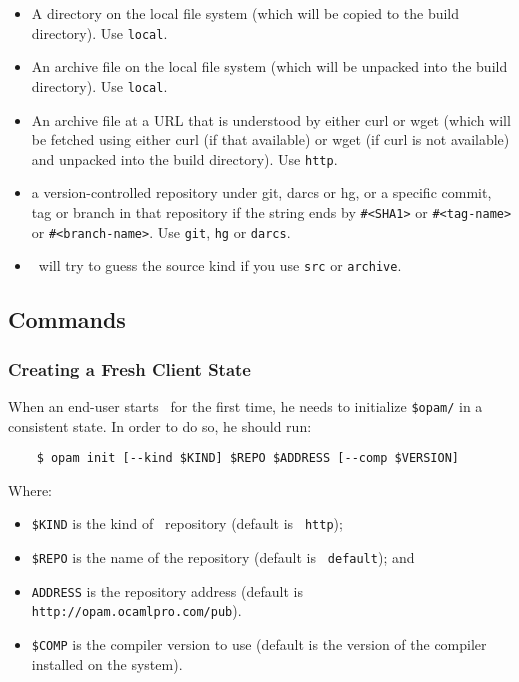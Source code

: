 \documentclass[a4paper,10pt]{article}
\begin{document}
\begin{itemize}
\item A directory on the local file system (which will be copied to
  the build directory). Use {\tt local}.
\item An archive file on the local file system (which will be unpacked
  into the build directory). Use {\tt local}.
\item An archive file at a URL that is understood by either curl or
  wget (which will be fetched using either curl (if that available) or
  wget (if curl is not available) and unpacked into the build
  directory). Use {\tt http}.
\item a version-controlled repository under git, darcs or
  hg, or a specific commit, tag or branch in that repository if
  the string ends by \verb+#<SHA1>+ or \verb+#<tag-name>+ or
  \verb+#<branch-name>+. Use {\tt git}, {\tt hg} or {\tt darcs}.
\item \OPAM\ will try to guess the source kind if you use {\tt src} or
  {\tt archive}.
\end{itemize}

\subsection{Commands}

\subsubsection{Creating a Fresh Client State}
\label{opam-init}

When an end-user starts \OPAM\ for the first time, he needs to
initialize \verb+$opam/+ in a consistent state. In order to do so, he
should run:

\begin{verbatim}
    $ opam init [--kind $KIND] $REPO $ADDRESS [--comp $VERSION]
\end{verbatim}

Where:
\begin{itemize}
\item \verb+$KIND+ is the kind of \OPAM\ repository (default is {\tt
  http});
\item \verb+$REPO+ is the name of the repository (default is {\tt
  default}); and
\item \verb+ADDRESS+ is the repository address (default is
  \verb+http://opam.ocamlpro.com/pub+).
\item \verb+$COMP+ is the compiler version to use (default is the
  version of the compiler installed on the system).
\end{itemize}
\end{document}
